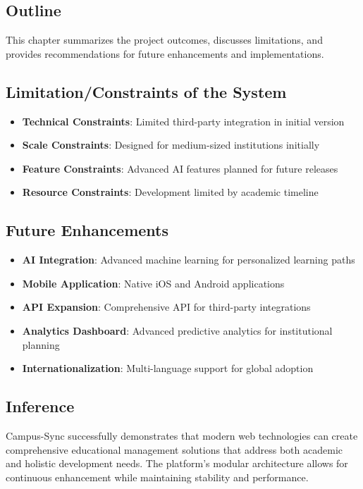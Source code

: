 \subsection{Outline}
This chapter summarizes the project outcomes, discusses limitations, and provides recommendations for future enhancements and implementations.

\subsection{Limitation/Constraints of the System}
\begin{itemize}
\item \textbf{Technical Constraints}: Limited third-party integration in initial version
\item \textbf{Scale Constraints}: Designed for medium-sized institutions initially
\item \textbf{Feature Constraints}: Advanced AI features planned for future releases
\item \textbf{Resource Constraints}: Development limited by academic timeline
\end{itemize}

\subsection{Future Enhancements}
\begin{itemize}
\item \textbf{AI Integration}: Advanced machine learning for personalized learning paths
\item \textbf{Mobile Application}: Native iOS and Android applications
\item \textbf{API Expansion}: Comprehensive API for third-party integrations
\item \textbf{Analytics Dashboard}: Advanced predictive analytics for institutional planning
\item \textbf{Internationalization}: Multi-language support for global adoption
\end{itemize}

\subsection{Inference}
Campus-Sync successfully demonstrates that modern web technologies can create comprehensive educational management solutions that address both academic and holistic development needs. The platform's modular architecture allows for continuous enhancement while maintaining stability and performance.

